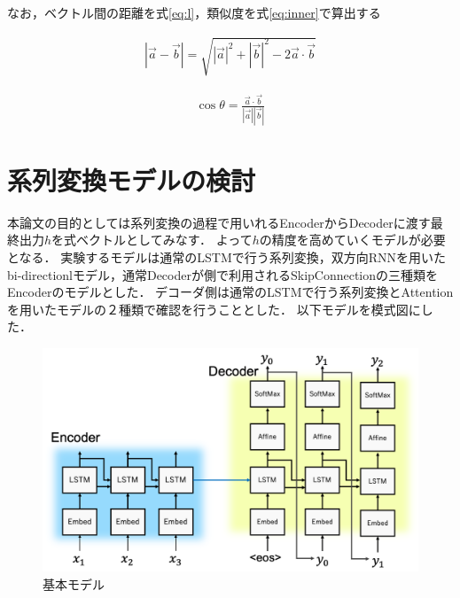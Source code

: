 \documentclass[a4j,11pt,report]{jsbook}
\begin{document}
なお，ベクトル間の距離を式\ref{eq:l}，類似度を式\ref{eq:inner}で算出する


\begin{equation}
  \label{eq:l}
  \begin{split}
    |\vec{a}-\vec{b}| =  \sqrt{|\vec{a}|^2 + |\vec{b}|^2 - 2  \vec{a} \cdot \vec{b}}
  \end{split}
\end{equation}

\begin{equation}
  \label{eq:inner}
  \begin{split}
    \cos \theta = \frac{\vec{a} \cdot \vec{b}}{|\vec{a}| |\vec{b}|}
  \end{split}
\end{equation}

\section{系列変換モデルの検討}
本論文の目的としては系列変換の過程で用いれるEncoderからDecoderに渡す最終出力$h$を式ベクトルとしてみなす．
よって$h$の精度を高めていくモデルが必要となる．
実験するモデルは通常のLSTMで行う系列変換，双方向RNNを用いたbi-directionlモデル，通常Decoderが側で利用されるSkipConnectionの三種類をEncoderのモデルとした．
デコーダ側は通常のLSTMで行う系列変換とAttentionを用いたモデルの２種類で確認を行うこととした．
以下モデルを模式図にした．



\begin{center}
  \begin{figure}[H]
    \centering
    \includegraphics[width=\linewidth]{image/seq2seq_image.png}
    \caption{基本モデル}
    \label{fig:seq2seq}
  \end{figure}
\end{center}
\end{document}
